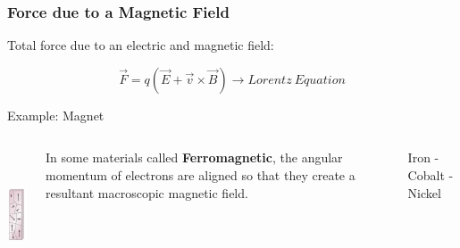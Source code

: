 \documentclass[]{beamer}
\begin{document}




\begin{frame}
\frametitle{Force due to a Magnetic Field}



Total force due to an electric and magnetic field:

\vspace{3mm}
\pause

\begin{equation}
\vec{F}=q(\vec{E}+\vec{v}\times \vec{B})\rightarrow Lorentz~Equation
\end{equation}






  \end{frame}



\begin{frame}

Example: Magnet
   \begin{columns}[c]
   \column{2in}  %

  \begin{center}
  \includegraphics[height=1.5in]{images5/ferromagnetic.jpg}
\end{center}


   \column{2in}

\pause



In some materials called \textbf{Ferromagnetic}, the angular momentum of electrons are aligned so that they create a resultant macroscopic magnetic field.

\vspace{3mm}

\pause

Iron - Cobalt - Nickel

   \end{columns}









  \end{frame}
\end{document}
